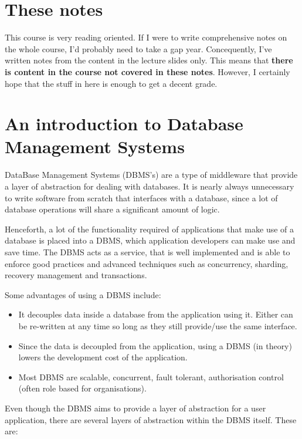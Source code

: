 
\section{These notes}

This course is very reading oriented. If I were to write comprehensive notes on
the whole course, I'd probably need to take a gap year. Concequently, I've
written notes from the content in the lecture slides only. This means that
\textbf{there is content in the course not covered in these notes}. However, I
certainly hope that the stuff in here is enough to get a decent grade.

\section{An introduction to Database Management Systems}

DataBase Management Systems (DBMS's) are a type of middleware that provide a
layer of abstraction for dealing with databases. It is nearly always unnecessary
to write software from scratch that interfaces with a database, since a lot of
database operations will share a significant amount of logic.

Henceforth, a lot of the functionality required of applications that make use of
a database is placed into a DBMS, which application developers can make use and
save time. The DBMS acts as a service, that is well implemented and is able to
enforce good practices and advanced techniques such as concurrency, sharding,
recovery management and transactions.

Some advantages of using a DBMS include:

\begin{itemize}
  \item It decouples data inside a database from the application using it.
        Either can be re-written at any time so long as they still provide/use
        the same interface.
  \item Since the data is decoupled from the application, using a DBMS (in
        theory) lowers the development cost of the application.
  \item Most DBMS are scalable, concurrent, fault tolerant, authorisation
        control (often role based for organisations).
\end{itemize}

Even though the DBMS aims to provide a layer of abstraction for a user
application, there are several layers of abstraction within the DBMS itself.
These are:

